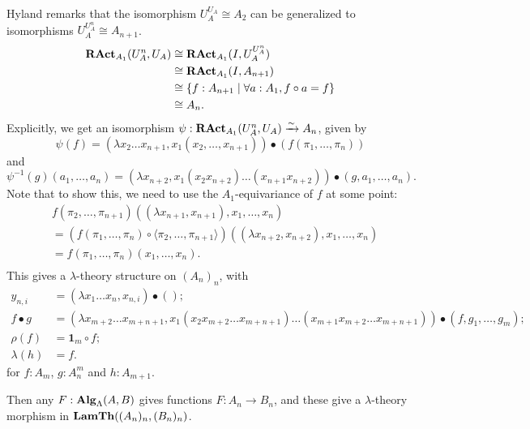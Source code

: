 \begin{remark}\label{rem:alternative-algebra-to-theory}
  Hyland remarks that the isomorphism $ U_A^{U_A} \cong A_2 $ can be generalized to isomorphisms $ U_A^{U_A^n} \cong A_{n + 1} $.
  \begin{align*}
    \mathbf{RAct}_{A_1}(U_A^n, U_A)
    &\cong \mathbf{RAct}_{A_1}(I, U_A^{U_A^n})\\
    &\cong \mathbf{RAct}_{A_1}(I, A_{n + 1})\\
    &\cong \{ f : A_{n + 1} \mid \forall a : A_1, f \circ a = f \}\\
    &\cong A_n.
  \end{align*}
  Explicitly, we get an isomorphism $ \psi: \mathbf{RAct}_{A_1}(U_A^n, U_A) \xrightarrow \sim A_n $, given by
  \[ \psi(f) = (\lambda x_2 \dots x_{n + 1}, x_1 (x_2, \dots, x_{n + 1})) \bullet (f (\pi_1, \dots, \pi_n)) \]
  and
  \[ \psi^{-1}(g)(a_1, \dots, a_n) = (\lambda x_{n + 2}, x_1 (x_2 x_{n + 2}) \dots (x_{n + 1} x_{n + 2})) \bullet (g, a_1, \dots, a_n). \]
  Note that to show this, we need to use the $ A_1 $-equivariance of $ f $ at some point:
  \begin{align*}
    &f(\pi_2, \dots, \pi_{n + 1})((\lambda x_{n + 1}, x_{n + 1}), x_1, \dots, x_n)\\
    &= (f(\pi_1, \dots, \pi_n) \circ \langle \pi_2, \dots, \pi_{n + 1} \rangle) ((\lambda x_{n + 2}, x_{n + 2}), x_1, \dots, x_n)\\
    &= f(\pi_1, \dots, \pi_n) (x_1, \dots, x_n).\\
  \end{align*}
  This gives a $ \lambda $-theory structure on $ (A_n)_n $, with
  \begin{align*}
    y_{n, i} &= (\lambda x_1 \dots x_n, x_{n, i}) \bullet ();\\
    f \bullet g &= (\lambda x_{m + 2} \dots x_{m + n + 1}, x_1 (x_2 x_{m + 2} \dots x_{m + n + 1}) \dots (x_{m + 1} x_{m + 2} \dots x_{m + n + 1})) \bullet (f, g_1, \dots, g_m);\\
    \rho(f) &= \mathbf 1_m \circ f;\\
    \lambda(h) &= f.
  \end{align*}
  for $ f: A_m $, $ g: A_n^m $ and $ h: A_{m + 1} $.

  Then any $ F: \mathbf{Alg}_{\Lambda}(A, B) $ gives functions $ F: A_n \to B_n $, and these give a $ \lambda $-theory morphism in $ \mathbf{LamTh}((A_n)_n, (B_n)_n) $.


\end{remark}
